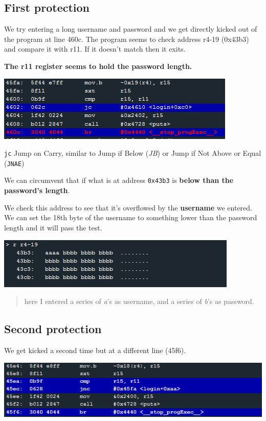 \documentclass[a4paper,11pt]{article}
\begin{document}
\subsection{First protection}\label{first-protection}

We try entering a long username and password and we get directly kicked
out of the program at line 460c. The program seems to check address
r4-19 (0x43b3) and compare it with r11. If it doesn't match then it
exits.

\textbf{The r11 register seems to hold the password length.}

\includegraphics{img/10_1.PNG}

\texttt{jc} Jump on Carry, similar to Jump if Below (\emph{JB}) or Jump
if Not Above or Equal (\texttt{JNAE})

We can circumvent that if what is at address \texttt{0x43b3} is
\textbf{below than the password's length}.

We check this address to see that it's overflowed by the
\textbf{username} we entered. We can set the 18th byte of the username
to something lower than the password length and it will pass the test.

\includegraphics{img/10_2.PNG}

\begin{quote}
here I entered a series of \emph{a}'s as username, and a series of
\emph{b}'s as password.
\end{quote}

\subsection{Second protection}\label{second-protection}

We get kicked a second time but at a different line (45f6).

\includegraphics{img/10_3.PNG}
\end{document}
